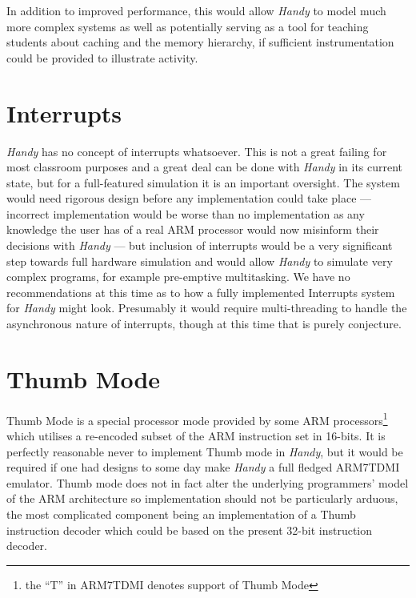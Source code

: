 In addition to improved performance, this would allow \emph{Handy} to model much more complex systems as well as potentially serving as a tool for teaching students about caching and the memory hierarchy, if sufficient instrumentation could be provided to illustrate activity.


\section{Interrupts}

\emph{Handy} has no concept of interrupts whatsoever. This is not a great failing for most classroom purposes and a great deal can be done with \emph{Handy} in its current state, but for a full-featured simulation it is an important oversight. The system would need rigorous design before any implementation could take place --- incorrect implementation would be worse than no implementation as any knowledge the user has of a real ARM processor would now misinform their decisions with \emph{Handy} --- but inclusion of interrupts would be a very significant step towards full hardware simulation and would allow \emph{Handy} to simulate very complex programs, for example pre-emptive multitasking. We have no recommendations at this time as to how a fully implemented Interrupts system for \emph{Handy} might look. Presumably it would require multi-threading to handle the asynchronous nature of interrupts, though at this time that is purely conjecture.


\section{Thumb Mode}

Thumb Mode is a special processor mode provided by some ARM processors\footnote{the ``T'' in ARM7TDMI denotes support of Thumb Mode} which utilises a re-encoded subset of the ARM instruction set in 16-bits. It is perfectly reasonable never to implement Thumb mode in \emph{Handy}, but it would be required if one had designs to some day make \emph{Handy} a full fledged ARM7TDMI emulator. Thumb mode does not in fact alter the underlying programmers' model of the ARM architecture\citep[pp. A6-2]{armarm:2005} so implementation should not be particularly arduous, the most complicated component being an implementation of a Thumb instruction decoder which could be based on the present 32-bit instruction decoder.

